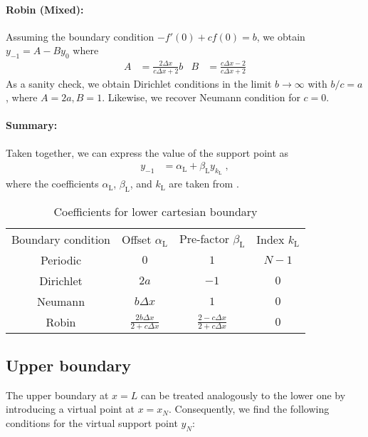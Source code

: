\documentclass[
	superscriptaddress,
	twocolumn,
	aps, prl
]{revtex4-1}
\newcommand{\dx}{\Delta x}
\renewcommand{\L}{_\mathrm{L}}
\begin{document}
\paragraph{Robin (Mixed):}
Assuming the boundary condition $-f'(0) + c f(0) = b $, we obtain $y_{-1} = A - B y_0$
where 
\begin{align}
	A &= \frac{2\dx}{c \dx + 2} b
&
	B &= \frac{c\dx - 2}{c \dx + 2}
\end{align}
As a sanity check, we obtain Dirichlet conditions in the limit $b \rightarrow \infty$ with $b/c = a$, where $A=2a, B=1$.
Likewise, we recover Neumann condition for $c=0$.

\paragraph{Summary:}
Taken together, we can express the value of the support point as
\begin{align}
	y_{-1} &= \alpha\L + \beta\L y_{k\L}
	\;,
\end{align}
where the coefficients $\alpha\L$, $\beta\L$, and $k\L$ are taken from .


\begin{table}[t]
\caption{\label{tab:cartesian_lower}%
Coefficients for lower cartesian boundary
}
\begin{ruledtabular}
	\begin{tabular}{cccc}
		Boundary condition & Offset $\alpha\L$ & Pre-factor $\beta\L$  & Index $k\L$\\
		\colrule
		Periodic & $0$ & $1$ & $N-1$ \\
		Dirichlet & $2a$ & $-1$ & $0$ \\
		Neumann & $b\dx$ & $1$  & $0$ \\
		Robin & $\frac{2b\dx}{2 + c \dx}$ &
				$\frac{2 - c\dx}{2 + c \dx}$ & $0$ \\
	\end{tabular}
\end{ruledtabular}
\end{table}


\subsection{Upper boundary}
The upper boundary at $x=L$ can be treated analogously to the lower one by introducing a virtual point at $x=x_N$.
Consequently, we find the following conditions for the virtual support point $y_N$:
\end{document}
